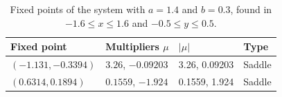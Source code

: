 \begin{table}
\centering
\caption{Fixed points of the system with $a = 1.4$ and $b = 0.3$, found in $-1.6 \le x \le 1.6$ and $-0.5 \le y \le 0.5$.}
\label{tab:henon-map-fixed-points}
\begin{tabular}{@{}llll@{}}
\toprule
Fixed point & Multipliers $\mu$ & $\lvert\mu\rvert$ & Type \\
\midrule
$(\num{-1.131}, \num{-0.3394})$ & $\num{3.26}$, $\num{-0.09203}$ & \num{3.26}, \num{0.09203} & Saddle \\
$(\num{0.6314}, \num{0.1894})$ & $\num{0.1559}$, $\num{-1.924}$ & \num{0.1559}, \num{1.924} & Saddle \\
\bottomrule
\end{tabular}
\end{table}
